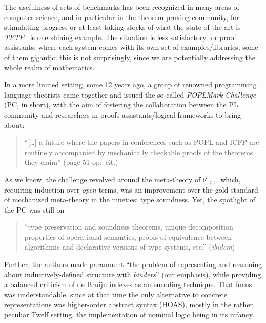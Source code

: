 The usefulness of sets of benchmarks has  been recognized in many areas
of computer science, and in particular in the theorem proving
community, for stimulating progress or at least taking stocks of what
the state of the art is --- \emph{TPTP}~\citep{TPTP} is one  shining
example. The situation is less satisfactory for proof assistants,
where each system comes with its own set of examples/libraries, some
of them gigantic; this is  not surprisingly, since we are
potentially addressing the whole realm of mathematics.



In a more limited setting, some 12 years ago, a group of renowned
programming language theorists came together and issued the so-called
\emph{POPLMark Challenge}~\citep{Aydemir05TPHOLs} (PC, in short), with
the aim of fostering the collaboration between the PL community and
researchers in proofs assistants/logical frameworks to bring about:
\begin{quote}
  ``[\dots] a future where the papers in conferences such as POPL and
  ICFP are routinely accompanied by mechanically checkable proofs of
  the theorems they claim'' (page 51 op.\ cit.)
\end{quote}
As we know, the challenge revolved around the meta-theory of
$\mathtt{F_{<:}}$, which, requiring induction over \emph{open} terms,
was an improvement over the gold standard of mechanized meta-theory in
the nineties: type soundness. Yet, the spotlight of the PC was still on
\begin{quote}
  ``type preservation and soundness theorems, unique decomposition
  properties of operational semantics, proofs of equivalence between
  algorithmic and declarative versions of type systems, etc.''
  (\emph{ibidem})
\end{quote}

Further, the authors made paramount ``the problem of representing and
reasoning about inductively-defined structure with \emph{binders}'' (our emphasis), while
providing a balanced criticism of de Bruijn indexes as an encoding
technique. That focus was understandable, since at that time the
only alternative to concrete representations was higher-order abstract
syntax (HOAS), mostly in the rather peculiar Twelf setting, the
implementation of nominal logic being in its infancy.

